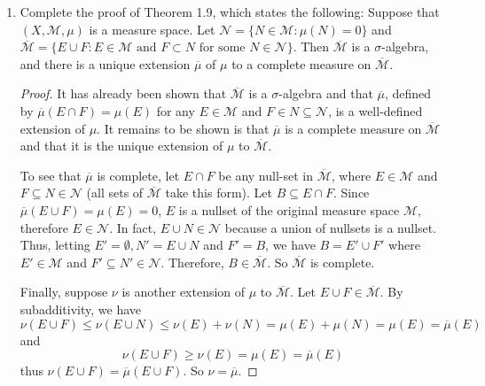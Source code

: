 \documentclass[10pt]{article}
\newcommand{\N}{\mathbb{N}}
\newcommand{\M}{\mathcal{M}}
\renewcommand{\bar}{\overline}
\begin{document}
\begin{enumerate}
\begin{proof}
The forward direction holds simply by definition of a $\sigma$-algebra, since a countable increasing union is a countable union.  Suppose $\A$ is an algebra closed under countable increasing unions.  Let $(E_i)$ be any countable sequence of sets in $\A$, and for each $i$ define $F_i = E_1 \cup \cdots \cup E_i$.  $\A$ is an algebra, so $F_i \in \A$.  Also, for each $i$ we have $F_i \subseteq F_{i+1}$, so $(F_i)$ is an increasing sequence and thus $\bigcup_{i \in \N} F_i \in \A$.  But clearly, $\bigcup_{i \in \N} E_i = \bigcup_{i \in \N} F_i$, thus $\A$ is closed under countable unions.
\end{proof}

\let\A\undefined

\renewcommand{\M}{\mathscr{M}}
\renewcommand{\NN}{\mathscr{N}}

\item Complete the proof of Theorem 1.9, which states the following: Suppose that $(X,\M,\mu)$ is a measure space.  Let $\NN = \{ N \in \M : \mu(N) = 0 \}$ and $\bar{\M} = \{ E \cup F : E \in \M \text{ and } F \subset N \text{ for some } N \in \NN \}$.  Then $\bar{\M}$ is a $\sigma$-algebra, and there is a unique extension $\bar{\mu}$ of $\mu$ to a complete measure on $\bar{\M}$.

\begin{proof}
It has already been shown that $\bar{\M}$ is a $\sigma$-algebra and that $\bar{\mu}$, defined by $\bar{\mu}(E \cap F) = \mu(E)$ for any $E \in \M$ and $F \in N \subseteq \NN$, is a well-defined extension of $\mu$.  It remains to be shown is that $\bar{\mu}$ is a complete measure on $\bar{\M}$ and that it is the unique extension of $\mu$ to $\bar{\M}$.

To see that $\bar{\mu}$ is complete, let $E \cap F$ be any null-set in $\bar{\M}$, where $E \in \M$ and $F \subseteq N \in \NN$ (all sets of $\bar{\M}$ take this form).  Let $B \subseteq E \cap F$.  Since $\bar{\mu}(E \cup F) = \mu(E) = 0$, $E$ is a nullset of the original measure space $\M$, therefore $E \in \NN$.  In fact, $E \cup N \in \NN$ because a union of nullsets is a nullset.  Thus, letting $E' = \emptyset, N' = E \cup N$ and $F' = B$, we have $B = E' \cup F'$ where $E' \in \M$ and $F' \subseteq N' \in \NN$.  Therefore, $B \in \bar{\M}$.  So $\bar{\M}$ is complete.

Finally, suppose $\nu$ is another extension of $\mu$ to $\bar{\M}$.  Let $E \cup F \in \bar{\M}$.  By subadditivity, we have
$$
\nu(E \cup F) \leq \nu(E \cup N) \leq \nu(E) + \nu(N) = \mu(E) + \mu(N) = \mu(E) = \bar{\mu}(E)
$$
and
$$
\nu(E \cup F) \geq \nu(E) = \mu(E) = \bar{\mu}(E)
$$
thus $\nu(E \cup F) = \bar{\mu}(E \cup F)$.  So $\nu = \bar{\mu}$.
\end{proof}


\end{enumerate}
\end{document}
